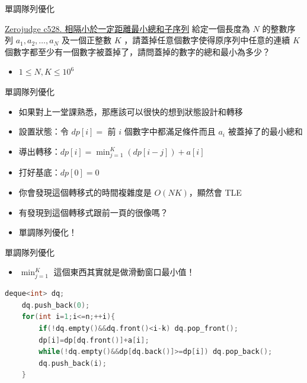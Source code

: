 \documentclass[aspectratio=169]{beamer}
\begin{document}
    \begin{frame}{單調隊列優化}
        \begin{block}{\href{https://zerojudge.tw/ShowProblem?problemid=c528}{Zerojudge c528. 相隔小於一定距離最小總和子序列}}
            給定一個長度為 $N$ 的整數序列 $a_1,a_2,\dots,a_N$
            及一個正整數 $K$ ，請蓋掉任意個數字使得原序列中任意的連續 $K$ 個數字都至少有一個數字被蓋掉了，請問蓋掉的數字的總和最小為多少？
            \vspace{5mm}
            \begin{itemize}
                \item $1 \le N,K \le 10^6$
            \end{itemize}
        \end{block}
    \end{frame}

    \begin{frame}{單調隊列優化}
        \begin{itemize}
            \item 如果對上一堂課熟悉，那應該可以很快的想到狀態設計和轉移
            \item<2-> 設置狀態：令 $dp[i] = $ 前 $i$ 個數字中都滿足條件而且 $a_i$ 被蓋掉了的最小總和
            \item<3-> 導出轉移：$dp[i] = \min_{j=1}^{K}(dp[i-j])+a[i]$
            \item<4-> 打好基底：$dp[0] = 0$
            \item<5-> 你會發現這個轉移式的時間複雜度是 $O(NK)$，顯然會 TLE
            \item<6-> 有發現到這個轉移式跟前一頁的很像嗎？
            \item<7-> 單調隊列優化！
        \end{itemize}
    \end{frame}

    \begin{frame}[fragile]{單調隊列優化}
        \begin{itemize}
            \item $\min_{j=1}^{K}$ 這個東西其實就是做滑動窗口最小值！
        \end{itemize}
        \begin{lstlisting}[language=C++, basicstyle=\ttfamily\small]
    deque<int> dq;
    dq.push_back(0);
    for(int i=1;i<=n;++i){
        if(!dq.empty()&&dq.front()<i-k) dq.pop_front();
        dp[i]=dp[dq.front()]+a[i];
        while(!dq.empty()&&dp[dq.back()]>=dp[i]) dq.pop_back();
        dq.push_back(i);
    }
        \end{lstlisting}
    \end{frame}
    
\end{document}
